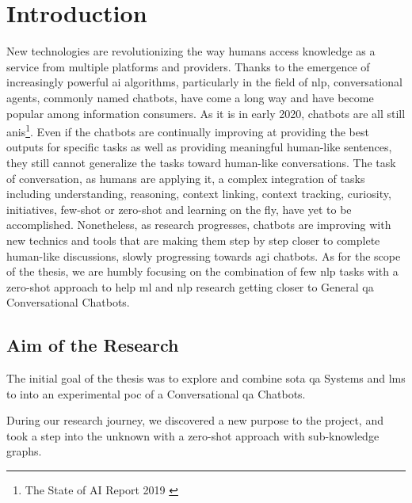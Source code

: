 \chapter{Introduction}
\label{chap:introduction}

New technologies are revolutionizing the way humans access knowledge as a service from multiple platforms and providers. Thanks to the emergence of increasingly powerful \gls{ai} algorithms, particularly in the field of \gls{nlp}, conversational agents, commonly named chatbots, have come a long way and have become popular among information consumers. As it is in early 2020, chatbots are all still \glspl{ani}\footnote{The State of AI Report 2019 \autocite{studies:state_of_ai_2019}}. Even if the chatbots are continually improving at providing the best outputs for specific tasks as well as providing meaningful human-like sentences, they still cannot generalize the tasks toward human-like conversations. The task of conversation, as humans are applying it, a complex integration of tasks including understanding, reasoning, context linking, context tracking, curiosity, initiatives, \gls{few-shot} or \gls{zero-shot} and learning on the fly, have yet to be accomplished. Nonetheless, as research progresses, chatbots are improving with new technics and tools that are making them step by step closer to complete human-like discussions, slowly progressing towards \gls{agi} chatbots. As for the scope of the thesis, we are humbly focusing on the combination of few \gls{nlp} tasks with a \gls{zero-shot} approach to help \gls{ml} and \gls{nlp} research getting closer to General \gls{qa} Conversational Chatbots. 

\section{Aim of the Research}
The initial goal of the thesis was to explore and combine \gls{sota} \gls{qa} Systems and \glspl{lm} to into an experimental \gls{poc} of a Conversational \gls{qa} Chatbots.

During our research journey, we discovered a new purpose to the project, and took a step into the unknown with a \gls{zero-shot} approach with sub-knowledge graphs.

